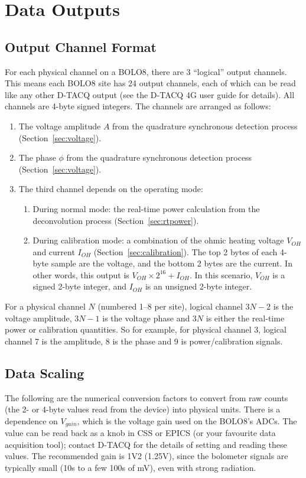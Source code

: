 \documentclass[12pt,a4paper]{article}
\begin{document}
\section{Data Outputs}
\label{sec:outputs}
\subsection{Output Channel Format}
\label{sec:channels}
For each physical channel on a BOLO8, there are 3 ``logical'' output channels. This means each BOLO8 site has 24 output channels, each of which can be read
like any other D-TACQ output (see the D-TACQ 4G user guide for details). All channels are 4-byte signed integers. The channels are arranged as follows:
\begin{enumerate}
\item{The voltage amplitude $A$ from the quadrature synchronous detection process (Section~\ref{sec:voltage}).}
\item{The phase $\phi$ from the quadrature synchronous detection process (Section~\ref{sec:voltage}).}
\item{The third channel depends on the operating mode:}
  \begin{enumerate}
  \item{During normal mode: the real-time power calculation from the deconvolution process (Section~\ref{sec:rtpower}).}
  \item{During calibration mode: a combination of the ohmic heating voltage $V_{OH}$ and current $I_{OH}$ (Section~\ref{sec:calibration}). The top 2 bytes of
      each 4-byte sample are the voltage, and the bottom 2 bytes are the current. In other words, this output is $V_{OH} \times 2^{16} + I_{OH}$. In this
      scenario, $V_{OH}$ is a signed 2-byte integer, and $I_{OH}$ is an unsigned 2-byte integer.}
  \end{enumerate}
\end{enumerate}

For a physical channel $N$ (numbered 1--8 per site), logical channel $3N-2$ is the voltage amplitude, $3N-1$ is the voltage phase and $3N$ is either the
real-time power or calibration quantities. So for example, for physical channel 3, logical channel 7 is the amplitude, 8 is the phase and 9 is
power/calibration signals.

\subsection{Data Scaling}
\label{sec:scaling}
The following are the numerical conversion factors to convert from raw counts (the 2- or 4-byte values read from the device) into physical units. There is
a dependence on $V_{gain}$, which is the voltage gain used on the BOLO8's ADCs. The value can be read back as a knob in CSS or EPICS (or your favourite data
acquisition tool); contact D-TACQ for the details of setting and reading these values. The recommended gain is 1V2 (1.25V), since the bolometer signals are
typically small (10s to a few 100s of mV), even with strong radiation.
\end{document}
